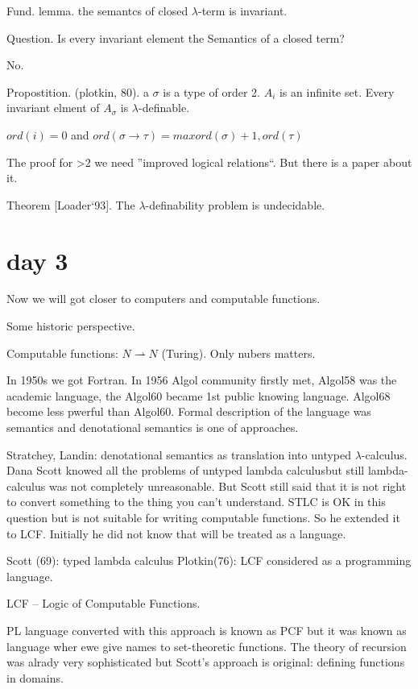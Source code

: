 \documentclass[a4paper,10pt]{book}
\begin{document}
Fund. lemma. the semantcs of closed $\lambda$-term is invariant.

Question. Is every invariant element the Semantics of a closed term?   

No.

Propostition. (plotkin, 80). a $\sigma$ is a type of order 2. $A_i$ is an infinite set. Every invariant  
elment of $A_\sigma$ is $\lambda$-definable.

$ord(i) = 0$ and $ord(\sigma \rightarrow \tau) = max { ord(\sigma) + 1, ord(\tau)}$

The proof for >2 we need ''improved logical relations``. But there is a paper about it.

Theorem [Loader`93]. The $\lambda$-definability problem is undecidable.

\section{day 3}

Now we will got closer to computers and computable functions.

Some historic perspective.

Computable functions: $N \rightharpoonup N$ (Turing). Only nubers matters.

In 1950s we got Fortran. In 1956 Algol community firstly met, Algol58 was the academic language,
the Algol60 became 1st public knowing language. Algol68 become less pwerful than Algol60.
Formal description of the language was semantics and denotational semantics is one of approaches.

Stratchey, Landin: denotational semantics  as translation into untyped $\lambda$-calculus.
Dana Scott knowed all the problems of untyped lambda calculusbut still lambda-calculus was not 
completely unreasonable. But Scott still said that it is not right to convert something to the 
thing you can't understand. STLC is OK in this question but is not suitable for writing computable 
functions. So he extended it to LCF. Initially he did not know that will be treated as a language.

Scott (69): typed lambda calculus
Plotkin(76): LCF considered as a programming language.

LCF -- Logic of Computable Functions.

PL language converted with this approach is known as PCF but it was known as language wher ewe give 
names to set-theoretic functions. The theory of recursion was alrady very sophisticated but
Scott's approach is original: defining functions in domains.
\end{document}

